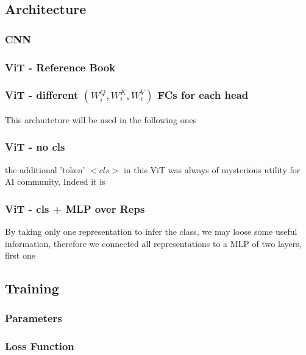 

\subsection{Architecture}

\subsubsection{CNN}


\subsubsection{ViT - Reference Book}

\subsubsection{ViT - different $(W^Q_i, W^K_i, W^V_i)$ FCs for each head}
This archuiteture will be used in the following ones

\subsubsection{ViT - no cls}
the additional 'token' $<cls>$ in this ViT was always of mysterious utility for AI community, Indeed it is 


\subsubsection{ViT - cls + MLP over Reps}
By taking only one representation to infer the class, we may loose some useful information, therefore we connected all representations to a MLP of two layers, first one 




\subsection{Training}
\subsubsection{Parameters}

\subsubsection{Loss Function}

